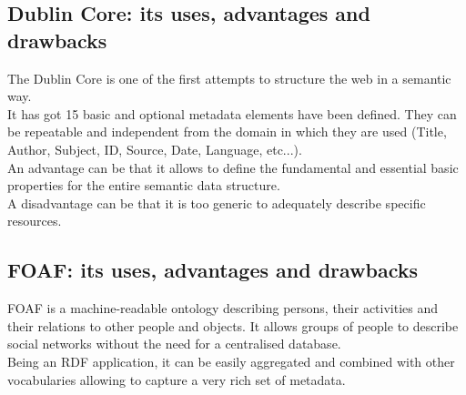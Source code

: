 \subsection{Dublin Core: its uses, advantages and drawbacks}
The Dublin Core is one of the first attempts to structure the web
in a semantic way.\\
It has got 15 basic and optional metadata elements have been defined.
They can be repeatable and independent from the domain in which they
are used (Title, Author, Subject, ID, Source, Date, Language, etc...).\\
An advantage can be that it allows to define the fundamental and
essential basic properties for the entire semantic data structure.\\
A disadvantage can be that it is too generic to adequately describe
specific resources.

\subsection{FOAF: its uses, advantages and drawbacks}
FOAF is a machine-readable ontology describing persons,
their activities and their relations to other people and objects.
It allows groups of people to describe social networks without
the need for a centralised database.\\
Being an RDF application, it can be easily aggregated and combined
with other vocabularies allowing to capture a very rich set of metadata.